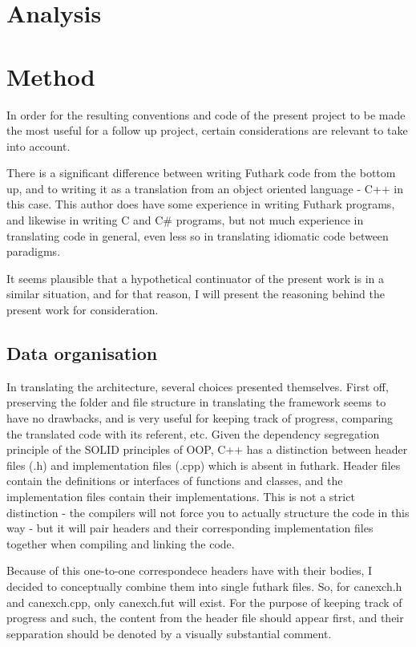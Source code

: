 \section{Analysis}
\section{Method}
In order for the resulting conventions and code of the present project to be made the most useful for a follow up project, certain considerations are relevant to take into account.

There is a significant difference between writing Futhark code from the bottom up, and to writing it as a translation from an object oriented language - C++ in this case. This author does have some experience in writing Futhark programs, and likewise in writing C and C\# programs, but not much experience in translating code in general, even less so in translating idiomatic code between paradigms.

It seems plausible that a hypothetical continuator of the present work is in a similar situation, and for that reason, I will present the reasoning behind the present work for consideration.

\subsection{Data organisation}
In translating the architecture, several choices presented themselves. First off, preserving the folder and file structure in translating the framework seems to have no drawbacks, and is very useful for keeping track of progress, comparing the translated code with its referent, etc. Given the dependency segregation principle of the SOLID principles of OOP, C++ has a distinction between header files (.h) and implementation files (.cpp) which is absent in futhark. Header files contain the definitions or interfaces of functions and classes, and the implementation files contain their implementations. This is not a strict distinction - the compilers will not force you to actually structure the code in this way - but it will pair headers and their corresponding implementation files together when compiling and linking the code.

Because of this one-to-one correspondece headers have with their bodies, I decided to conceptually combine them into single futhark files. So, for canexch.h and canexch.cpp, only canexch.fut will exist. For the purpose of keeping track of progress and such, the content from the header file should appear first, and their sepparation should be denoted by a visually substantial comment.

